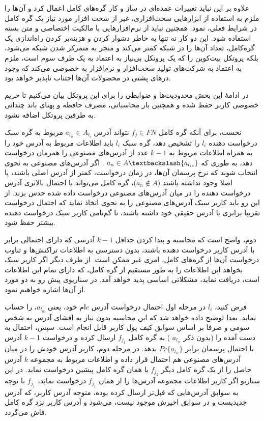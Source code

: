 علاوه بر این نباید تغییرات عمده‌ای در ساز و کار گره‌های کامل اعمال کرد و آن‌ها را ملزم به استفاده از ابزارهایی سخت‌افزاری، غیر از سخت افزار مورد نیاز یک گره کامل در شرایط فعلی، نمود. همچنین نباید از نرم‌افزارهایی با مالکیت اختصاصی و متن بسته استفاده شود. این دو کار نه تنها به خاطر دشوار کردن و هزینه‌بر کردن راه‌اندازی یک گره‌کامل، تعداد آن‌ها را در شبکه کمتر می‌کند و منجر به متمرکز شدن شبکه می‌شود، بلکه پروتکل بیت‌کوین را که یک پروتکل بی‌نیاز به اعتماد به یک طرف سوم است، ملزم به اعتماد به شرکت‌های تولید سخت‌افزار‌ و نرم‌افزار‌ به خصوصی می‌کند که وجود درهای پشتی در محصولات آن‌ها اجتناب ناپذیر خواهد بود. 

در ادامهٔ این بخش محدودیت‌ها و  ضوابطی را برای این پروتکل بیان می‌کنیم تا حریم خصوصی کاربر حفظ شده و  همچنین بار محاسباتی، مصرف حافظه و پهنای باند چندانی به طرفین پروتکل اضافه نشود.

نخست، برای آنکه گره کامل $f_j \in FN$ نتواند آدرس $a_{l_{ic}} \in A_{l_i}$ مربوط به گره سبک درخواست دهنده $l_i$ را تشخیص دهد، گره سبک $l_i$ باید اطلاعات مربوط به آدرس خود را به همراه اطلاعات مربوط به $k-1$ عدد از آدرس‌های مصنوعی را همزمان درخواست دهد، به طوری که
$ a_n \in A \textbackslash \{a_{l_{ic}}\}$
. اگر آدرس‌های مصنوعی به نحوی انتخاب شوند که نرخ پرسمان آن‌ها، در زمان درخواست، کمتر از آدرس اصلی باشند، یا اصلا وجود نداشته باشند
($a_n \notin A$)،
گره کامل می‌تواند با احتمال بالاتری آدرس درخواست دهنده را در میان آدرس‌های مصنوعی درخواست داده شده حدس بزند. از این رو باید کاربر سبک آدرس‌های مصنوعی را به نحوی اتخاذ نماید که احتمال درخواست تقریبا برابری با آدرس حقیقی خود داشته باشند، تا گم‌نامی کاربر سبک درخواست دهنده بیشتر حفظ ‌شود. 

دوم، واضح است که محاسبه و پیدا کردن حداقل $k-1$ آدرسی که دارای احتمالی برابر با آدرس کاربر درخواست دهنده باشند، بدون دسترسی به اطلاعات تراکنش‌ها و تناوب درخواست‌ آن‌ها از گره‌های کامل، امری غیر ممکن است. از طرف دیگر اگر کاربر سبک بخواهد این اطلاعات را به طور مستقیم از گره کامل، که دارای تمام این اطلاعات است، دریافت نماید، مشکلاتی اساسی پدید خواهد آمد. در سناریوی پیش رو به دو مورد از آن‌ها اشاره خواهیم نمود.

فرض کنید، $l_i$ در مرحله اول احتمال درخواست آدرس $c$ام خود، یعنی $a_{l_{ic}}$، را حساب نماید. بعدا توضیح داده خواهد شد که این محاسبه بدون نیاز به افشای آدرس به شخص سومی و صرفا بر اساس سوابق کیف پول کاربر قابل انجام است. سپس، احتمال به دست آمده را (بدون ذکر
$a_{l_{ic}}$
) به گره کامل 
$f_{j_1}$
ارسال کرده و  درخواست $k-1$ آدرس با احتمال پرسمان برابر
$Pr\{{a_{l_{ic}}}\}$
بدهد. در مرحله دوم، کاربر آدرس خودش را در میان آدرس‌های مصنوعی هم احتمال قرار داده و اطلاعات مربوط به مجموعه $k$ آدرس حاصل را از یک گره کامل دیگر $f_{j_2}$ یا همان گره کامل پیشین درخواست نماید.  در این سناریو اگر کاربر اطلاعات مجموعه آدرس‌ها را از همان $f_{j_1}$ درخواست نماید، $f_{j_1}$ با توجه به سوابق آدرس‌هایی که قبل‌تر ارسال کرده بوده، متوجه آدرس کاربر، که آدرس جدیدیست و در سوابق اخیرش موجود نیست، می‌شود و آدرس کاربر نزد گره کامل فاش می‌گردد. 


